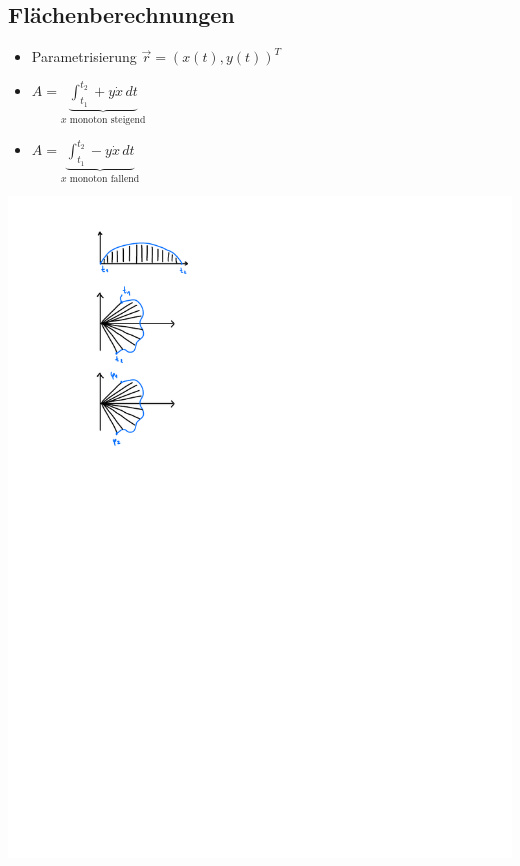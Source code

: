 \subsection{Flächenberechnungen}
    \vspace{0.5em}
    \begin{itemize}
        \item Parametrisierung $\vec{r}=(x(t),y(t))^T$ \hfill
    \end{itemize}
    \begin{minipage}{0.65\linewidth}
        \vspace{-1em}
        \begin{itemize}
        \item[]  $\displaystyle A= \underbrace{\int_{t_1}^{t_2} + y \dot{x} \, dt}_{x \textrm{ monoton steigend}}$
        \item[]  $\displaystyle A= \underbrace{\int_{t_1}^{t_2} - y \dot{x} \, dt}_{x \textrm{ monoton fallend}}$
        \end{itemize}
    \end{minipage}
    \begin{minipage}{0.34\linewidth}
        \includegraphics[width=0.7\linewidth]{src/Integralrechnung/param.pdf}
    \end{minipage}

